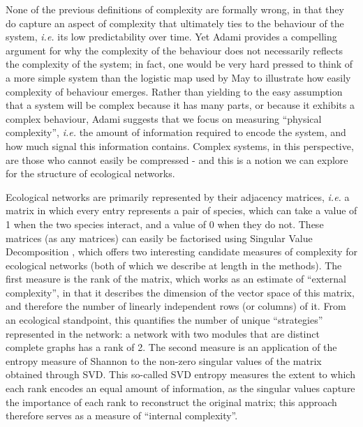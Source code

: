 None of the previous definitions of complexity are formally wrong, in that they
do capture an aspect of complexity that ultimately ties to the behaviour of the
system, \emph{i.e.} its low predictability over time. Yet
Adami\cite{Adami2002WhaCom} provides a compelling argument for why the
complexity of the behaviour does not necessarily reflects the complexity of the
system; in fact, one would be very hard pressed to think of a more simple system
than the logistic map used by May\cite{May1976SimMat} to illustrate how easily
complexity of behaviour emerges. Rather than yielding to the easy assumption
that a system will be complex because it has many parts, or because it exhibits
a complex behaviour, Adami\cite{Adami2002WhaCom} suggests that we focus on
measuring ``physical complexity'', \emph{i.e.} the amount of information
required to encode the system, and how much signal this information contains.
Complex systems, in this perspective, are those who cannot easily be compressed
- and this is a notion we can explore for the structure of ecological networks.

Ecological networks are primarily represented by their adjacency matrices,
\emph{i.e.} a matrix in which every entry represents a pair of species, which
can take a value of 1 when the two species interact, and a value of 0 when they
do not. These matrices (as any matrices) can easily be factorised using Singular
Value Decomposition \cite{Forsythe1967ComSol, Golub1971SinVal}, which offers two
interesting candidate measures of complexity for ecological networks (both of
which we describe at length in the methods). The first measure is the rank of
the matrix, which works as an estimate of ``external complexity'', in that it
describes the dimension of the vector space of this matrix, and therefore the
number of linearly independent rows (or columns) of it. From an ecological
standpoint, this quantifies the number of unique ``strategies'' represented in
the network: a network with two modules that are distinct complete graphs has a
rank of 2. The second measure is an application of the entropy measure of
Shannon\cite{Shannon1948MatThe} to the non-zero singular values of the matrix
obtained through SVD. This so-called SVD entropy measures the extent to which
each rank encodes an equal amount of information, as the singular values capture
the importance of each rank to reconstruct the original matrix; this approach
therefore serves as a measure of ``internal complexity''.

